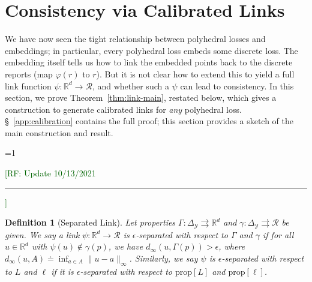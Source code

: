 \documentclass[11pt]{article}
\newcommand{\Comments}{1}
\newcommand{\mynote}[2]{\ifnum\Comments=1\textcolor{#1}{#2}\fi}
\newcommand{\raf}[1]{\mynote{darkgreen}{[RF: #1]}}
\newcommand{\reals}{\mathbb{R}}
\newcommand{\prop}[1]{\mathrm{prop}[#1]}
\newcommand{\simplex}{\Delta_\Y}
\newcommand{\R}{\mathcal{R}}
\newcommand{\Y}{\mathcal{Y}}
\newcommand{\toto}{\rightrightarrows}
\newtheorem{theorem}{Theorem}
\newtheorem{definition}{Definition}
\begin{document}
\section{Consistency via Calibrated Links}
\label{sec:calibration}

We have now seen the tight relationship between polyhedral losses and embeddings; in particular, every polyhedral loss embeds some discrete loss.
The embedding itself tells us how to link the embedded points back to the discrete reports (map $\varphi(r)$ to $r$).
But it is not clear how to extend this to yield a full link function $\psi: \reals^d \to \R$, and whether such a $\psi$ can lead to consistency.
In this section, we prove Theorem~\ref{thm:link-main}, restated below, which gives a construction to generate calibrated links for \emph{any} polyhedral loss.
\S~\ref{app:calibration} contains the full proof; this section provides a sketch of the main construction and result.

\linkinformal*

\raf{Update 10/13/2021\hrule}
\begin{definition}[Separated Link]\label{def:sep-link}
  Let properties $\Gamma:\simplex\toto\reals^d$ and $\gamma:\simplex\toto\R$ be given.
  We say a link $\psi:\reals^d\to\R$
  is \emph{$\epsilon$-separated with respect to $\Gamma$ and $\gamma$} if for all $u\in\reals^d$ with $\psi(u)\notin\gamma(p)$, we have $d_\infty(u,\Gamma(p)) > \epsilon$, where $d_\infty(u,A) \doteq \inf_{a\in A} \|u-a\|_\infty$.
  Similarly, we say $\psi$ is $\epsilon$-separated with respect to $L$ and $\ell$ if it is $\epsilon$-separated with respect to $\prop{L}$ and $\prop{\ell}$.
\end{definition}
\end{document}
